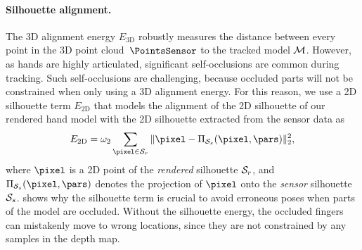 


\paragraph*{Silhouette alignment.}
The 3D alignment energy $E_{\text{3D}}$ robustly measures the distance between every point in the 3D point cloud~$\PointsSensor$ to the tracked model $\mathcal{M}$. However, as hands are highly articulated, significant self-occlusions are common during tracking. Such self-occlusions are challenging, because occluded parts will not be constrained when only using a 3D alignment energy. For this reason, we use a 2D silhouette term $E_{\text{2D}}$ that models the  alignment of the 2D silhouette of our rendered hand model with the 2D silhouette extracted from the sensor data as 
%
%
\begin{equation}
    E_{\text{2D}} = \omegasilhouette \sum_{\pixel \in \SilhoRender} \| \pixel - \proj_{\SilhoSensor}(\pixel,\pars) \|_2^2,
\label{eq:align2d}
\end{equation}
%
where $\pixel$ is a 2D point of the \emph{rendered} silhouette $\mathcal{S}_{r}$, and $\proj_{\SilhoSensor}(\pixel,\pars)$ denotes the projection of $\pixel$ onto the \emph{sensor} silhouette $\mathcal{S}_{s}$.
%
 shows why the silhouette term is crucial to avoid erroneous poses when parts of the model are occluded. 
Without the silhouette energy, the occluded fingers can mistakenly move to wrong locations, since they are not constrained by any samples in the depth map.







%
%
%



